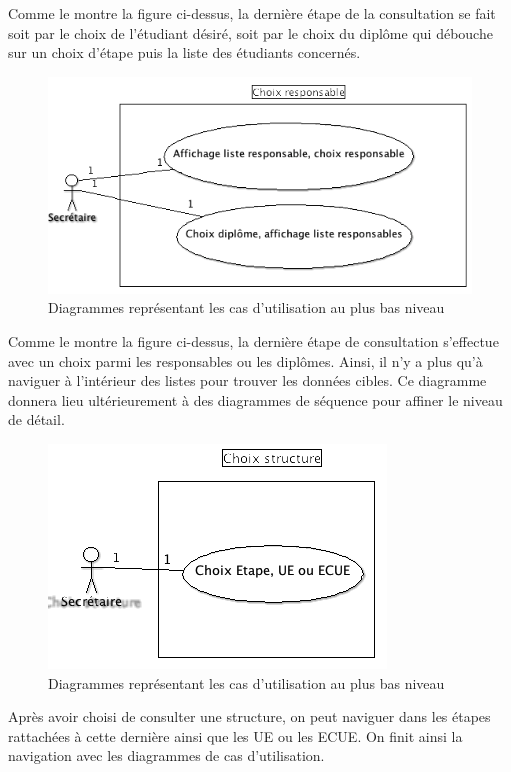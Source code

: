\documentclass[letter, 11pt] {article}
\begin{document}
Comme le montre la figure ci-dessus, la dernière étape de la consultation se fait soit par le choix de l'étudiant désiré, soit par le choix du diplôme qui débouche sur un choix d'étape puis la liste des étudiants concernés.

\newpage
			
\begin{figure}[!h]\centering
\includegraphics[scale = 0.7]{../UseCase/UseCaseTresBasNiveau/ChoixResponsable.png}
				\caption{Diagrammes représentant les cas d'utilisation au plus bas niveau}
\end{figure}

Comme le montre la figure ci-dessus, la dernière étape de consultation s'effectue avec un choix parmi les responsables ou les diplômes. Ainsi, il n'y a plus qu'à naviguer à l'intérieur des listes pour trouver les données cibles.
Ce diagramme donnera lieu ultérieurement à des diagrammes de séquence pour affiner le niveau de détail. 

			\begin{figure}[!h]	\centering
\includegraphics[scale = 0.7]{../UseCase/UseCaseTresBasNiveau/ChoixStructure.png}
				\caption{Diagrammes représentant les cas d'utilisation au plus bas niveau}
\end{figure}

Après avoir choisi de consulter une structure, on peut naviguer dans les étapes rattachées à cette dernière ainsi que les UE ou les ECUE. On finit ainsi la navigation avec les diagrammes de cas d'utilisation.
\end{document}
